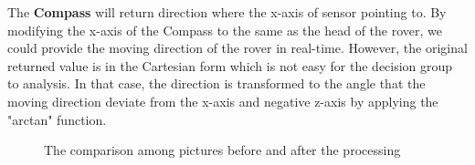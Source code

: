 The \textbf{Compass} will return direction where the x-axis of sensor pointing to. By modifying the x-axis of the Compass to the same as the head of the rover, we could provide the moving direction of the rover in real-time. However, the original returned value is in the Cartesian form which is not easy for the decision group to analysis. In that case, the direction is transformed to the angle that the moving direction deviate from the x-axis and negative z-axis by applying the "arctan" function.

\begin{figure}[htbp]
    \centering
    \caption{The comparison among pictures before and after the processing}
    \label{fig:camera}
\end{figure}

